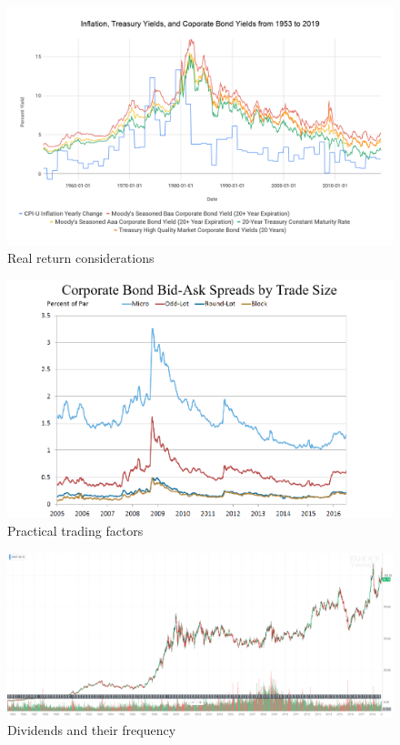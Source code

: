 \documentclass{article}
\begin{document}
\vspace{10pt}

\begin{figure}[!htb]
    \centering
    \includegraphics[width=\textwidth]{imgs/28.png}
    \caption{Real return considerations}
\end{figure}

\vspace{10pt}

\begin{figure}[!htb]
    \centering
    \includegraphics[width=\textwidth]{imgs/29.png}
    \caption{Practical trading factors}
\end{figure}

\vspace{10pt}

\begin{figure}[!htb]
    \centering
    \includegraphics[width=\textwidth]{imgs/30.png}
    \caption{Dividends and their frequency}
\end{figure}
\end{document}
